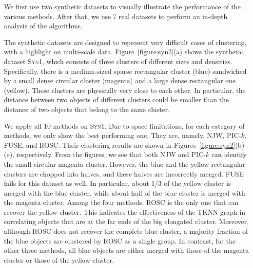 We first use two synthetic datasets to visually illustrate the performance of the various methods. 
After that, we use 7 real datasets to perform an in-depth analysis of the algorithms.

The synthetic datasets are designed to represent very difficult cases of clustering, with a highlight
on multi-scale data. 
Figure~\ref{figure:syn2}(a) shows the synthetic dataset \textsc{Syn1}, which consists of three clusters of
different sizes and densities. 
Specifically, there is a medium-sized sparse rectangular cluster (blue) sandwiched by a small dense circular
cluster (magenta) and a large dense rectangular one (yellow). These clusters are physically very close to each other. 
In particular, the distance between two objects of different clusters could be smaller than the distance of
two objects that belong to the same cluster.  

We apply all 10 methods on \textsc{Syn1}. 
Due to space limitations, for each category of methods, we only show the best performing one. 
They are, namely, NJW, PIC-$k$, FUSE, and ROSC. 
Their clustering results are shown in Figures~\ref{figure:syn2}(b)-(e), respectively. 
From the figures, we see that both NJW and PIC-$k$ can identify the small circular magenta cluster. 
However, the blue and the yellow rectangular clusters are chopped into halves, and these halves are
incorrectly merged. FUSE fails for this dataset as well. 
In particular, about 1/3 of the yellow cluster is merged with the blue cluster, while about half of the
blue cluster is merged with the magenta cluster. 
Among the four methods, ROSC is the only one that can recover the yellow cluster. 
This indicates the effectiveness of the TKNN graph in correlating objects that are at the far ends of 
the big elongated cluster. 
Moreover, although ROSC does not recover the complete blue cluster, a majority fraction of the
blue objects are clustered by ROSC as a single group. 
In contrast, for the other three methods, all blue objects are either merged with those of the magenta cluster
or those of the yellow cluster.

